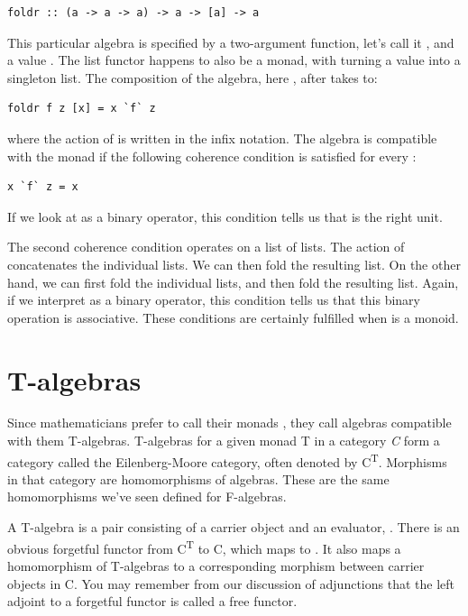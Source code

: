 \begin{Verbatim}[commandchars=\\\{\}]
foldr :: (a -> a -> a) -> a -> [a] -> a
\end{Verbatim}
This particular algebra is specified by a two-argument function, let's
call it , and a value . The list functor happens to
also be a monad, with  turning a value into a singleton
list. The composition of the algebra, here , after
 takes  to:

\begin{Verbatim}[commandchars=\\\{\}]
foldr f z [x] = x `f` z
\end{Verbatim}
where the action of  is written in the infix notation. The
algebra is compatible with the monad if the following coherence
condition is satisfied for every :

\begin{Verbatim}[commandchars=\\\{\}]
x `f` z = x
\end{Verbatim}
If we look at  as a binary operator, this condition tells us
that  is the right unit.

The second coherence condition operates on a list of lists. The action
of  concatenates the individual lists. We can then fold the
resulting list. On the other hand, we can first fold the individual
lists, and then fold the resulting list. Again, if we interpret
 as a binary operator, this condition tells us that this
binary operation is associative. These conditions are certainly
fulfilled when  is a monoid.

\section{T-algebras}\label{t-algebras}

Since mathematicians prefer to call their monads , they call
algebras compatible with them T-algebras. T-algebras for a given monad T
in a category \emph{C} form a category called the Eilenberg-Moore
category, often denoted by C\textsuperscript{T}. Morphisms in that
category are homomorphisms of algebras. These are the same homomorphisms
we've seen defined for F-algebras.

A T-algebra is a pair consisting of a carrier object and an evaluator,
. There is an obvious forgetful functor  from
C\textsuperscript{T} to C, which maps  to . It
also maps a homomorphism of T-algebras to a corresponding morphism
between carrier objects in C. You may remember from our discussion of
adjunctions that the left adjoint to a forgetful functor is called a
free functor.

